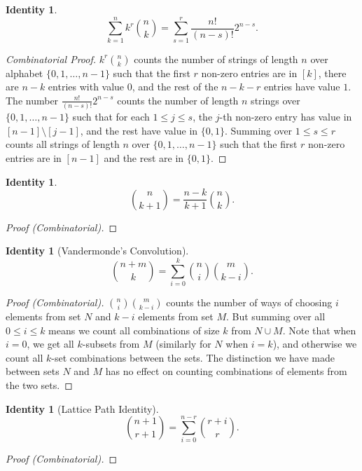 \documentclass[12]{article}
\newcounter{identityCounter}
\newtheorem{iden}[identityCounter]{Identity}
\theoremstyle{definition}
\begin{document}
	\begin{iden}
		
		$$\sum_{k = 1}^n k^r {n \choose k} = \sum_{s = 1}^r \frac{n!}{(n-s)!}2^{n-s}.$$
	\end{iden}
	\begin{proof}[Combinatorial Proof]
		$k^r {n \choose k}$ counts the number of strings of length $n$ over alphabet $\{0, 1, \ldots, n-1\}$ such that the first $r$ non-zero entries are in $[k]$, there are $n-k$ entries with value $0$, and the rest of the $n-k-r$ entries have value $1$.  The number $\frac{n!}{(n-s)!}2^{n-s}$ counts the number of length $n$ strings over $\{0, 1, \ldots, n-1\}$ such that for each $1 \leq j \leq s$, the $j$-th non-zero entry has value in $[n-1] \setminus [j-1]$, and the rest have value in $\{0,1\}$.  Summing over $1 \leq s \leq r$ counts all strings of length $n$ over $\{0, 1, \ldots, n-1\}$ such that the first $r$ non-zero entries are in $[n-1]$ and the rest are in $\{0,1\}$.
	\end{proof}
	
	\begin{iden}
		$${n \choose k+1} = \frac{n-k}{k+1}{n \choose k}.$$
	\end{iden}
	\begin{proof}[Proof (Combinatorial)]
		
	\end{proof}
	
	\begin{iden}[Vandermonde's Convolution]
		$${n+m \choose k} = \sum_{i=0}^k {n \choose i}{m \choose k-i}.$$
	\end{iden}
	\begin{proof}[Proof (Combinatorial)]
		${n \choose i}{m \choose k-i}$ counts the number of ways of choosing $i$ elements from set $N$ and $k-i$ elements from set $M$.  But summing over all $0 \leq i \leq k$ means we count all combinations of size $k$ from $N \cup M$.  Note that when $i = 0$, we get all $k$-subsets from $M$ (similarly for $N$ when $i = k$), and otherwise we count all $k$-set combinations between the sets.  The distinction we have made between sets $N$ and $M$ has no effect on counting combinations of elements from the two sets.
	\end{proof}
	
	\begin{iden}[Lattice Path Identity]
		$${n+1 \choose r+1} = \sum_{i = 0}^{n-r} {r+i \choose r}.$$
	\end{iden}
	\begin{proof}[Proof (Combinatorial)]
		
	\end{proof}
	
\end{document}
